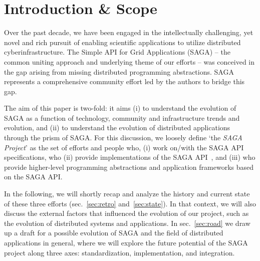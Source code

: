 \documentclass{article}
\newcommand{\I}[1]{\textit{#1}}
\begin{document}

\section{Introduction \& Scope }
\label{sec:intro}

 Over the past decade, we have been engaged in the intellectually
 challenging, yet novel and rich pursuit of enabling scientific
 applications to utilize distributed cyberinfrastructure. The Simple API
 for Grid Applications (SAGA) -- the common uniting approach and
 underlying theme of our efforts -- was conceived in the gap arising
 from missing distributed programming abstractions.  SAGA represents
 a comprehensive community effort led by the authors to bridge this gap.

 The aim of this paper is two-fold: it aims (i) to understand the
 evolution of SAGA as a function of technology, community and
 infrastructure trends and evolution, and (ii) to understand the
 evolution of distributed applications through the prism of SAGA.  For
 this discussion, we loosely define `the \I{SAGA Project}' as the set of
 efforts and people who, (i) work on/with the SAGA API
 specifications\cite{ogf-gfd-90}, who (ii) provide implementations of
 the SAGA API~\cite{Kaiser:2006qp,jsaga,javasaga}, and (iii) who provide
 higher-level programming abstractions and application frameworks based
 on the SAGA API\cite{bigjob_cloudcom10,fresh-dag-escience,Sehgal2011590}.

 In the following, we will shortly recap and analyze the history and
 current state of these three efforts (sec.~\ref{sec:retro}
 and~\ref{sec:state}). In that context, we will also discuss the
 external factors that influenced the evolution of our project, such as
 the evolution of distributed systems and applications.  In
 sec.~\ref{sec:road} we draw up a draft for a possible evolution of SAGA
 and the field of distributed applications in general, where we will
 explore the future potential of the SAGA project along three axes:
 standardization, implementation, and integration.
 
\end{document}
